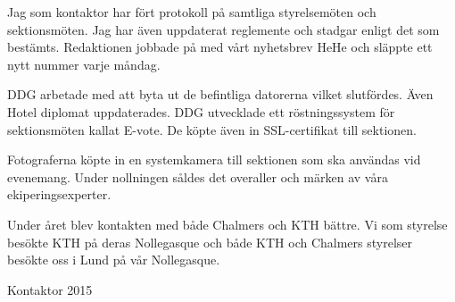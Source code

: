 \documentclass[../_main/handlingar.tex]{subfiles}
\begin{document}

Jag som kontaktor har fört protokoll på samtliga styrelsemöten och sektionsmöten. Jag har även uppdaterat reglemente och stadgar enligt det som bestämts. Redaktionen jobbade på med vårt nyhetsbrev HeHe och släppte ett nytt nummer varje måndag.

DDG arbetade med att byta ut de befintliga datorerna vilket slutfördes. Även Hotel diplomat uppdaterades. DDG utvecklade ett röstningssystem för sektionsmöten kallat E-vote. De köpte även in SSL-certifikat till sektionen.

Fotograferna köpte in en systemkamera till sektionen som ska användas vid evenemang. Under nollningen såldes det overaller och märken av våra ekiperingsexperter.

Under året blev kontakten med både Chalmers och KTH bättre. Vi som styrelse besökte KTH på deras Nollegasque och både KTH och Chalmers styrelser besökte oss i Lund på vår Nollegasque.

\begin{signatures}{1}
    \mvh
    \signature{Alexander Najafi}{Kontaktor 2015}
\end{signatures}
\end{document}
